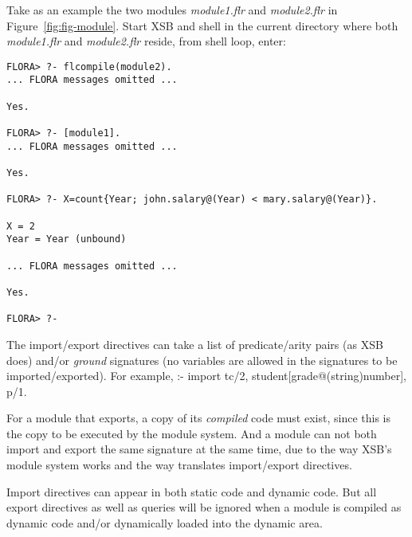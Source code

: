 \documentclass[11pt]{report}
\begin{document}
Take as an example the two \FLORA modules \emph{module1.flr} and \emph{module2.flr} in
Figure~\ref{fig:fig-module}. Start XSB and \FLORA shell in the current directory where
both \emph{module1.flr} and \emph{module2.flr} reside, from \FLORA shell loop, enter:
\begin{verbatim}
FLORA> ?- flcompile(module2).
... FLORA messages omitted ...

Yes.

FLORA> ?- [module1].
... FLORA messages omitted ...

Yes.

FLORA> ?- X=count{Year; john.salary@(Year) < mary.salary@(Year)}.

X = 2
Year = Year (unbound)

... FLORA messages omitted ...

Yes.

FLORA> ?-
\end{verbatim}

The import/export directives can take a list of predicate/arity pairs (as XSB does) and/or
\emph{ground} \fl signatures (no variables are allowed in the signatures to be
imported/exported). For example, :- import tc/2, student[grade@(string){\Fd}number], p/1.

For a \FLORA module that exports, a copy of its \emph{compiled} code must exist, since this is
the copy to be executed by the module system. And a \FLORA module can not both import and
export the same \fl signature at the same time, due to the way XSB's module system works and
the way \FLORA translates import/export directives.

Import directives can appear in both static code and dynamic code. But all export directives
as well as queries will be ignored when a \FLORA module is compiled as dynamic code and/or
dynamically loaded into the dynamic area.
\end{document}

